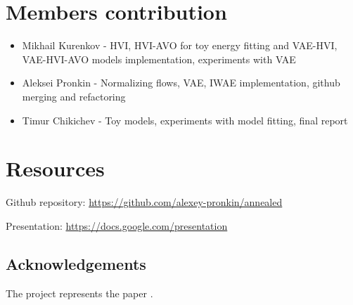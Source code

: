 \documentclass{article}
\begin{document}
\section{Members contribution}

\begin{itemize}
\item Mikhail Kurenkov - HVI, HVI-AVO for toy energy fitting and VAE-HVI, VAE-HVI-AVO models implementation, experiments with VAE
\item Aleksei Pronkin - Normalizing flows, VAE, IWAE implementation, github merging and refactoring
\item Timur Chikichev - Toy models, experiments with model fitting, final report
\end{itemize}


\listoffigures

\section{Resources}

Github repository:
\url{https://github.com/alexey-pronkin/annealed}

Presentation:
\href{https://docs.google.com/presentation/d/1QxO_b5iwcV-LyMfhngaZjaX4A5gRTuqDe1azaJpdtfM/edit?usp=sharing}{https://docs.google.com/presentation}

\subsection*{Acknowledgements}

The project represents the paper \cite{main_Huang2018ImprovingEI}.
\end{document}
